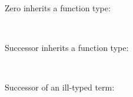 Zero inherits a function type:

\begin{fence}
\begin{code}%
\>[0]\AgdaFunction{\AgdaUnderscore{}}\AgdaSpace{}%
\AgdaSymbol{:}\AgdaSpace{}%
\AgdaSpace{}%
\AgdaSpace{}%
\AgdaSymbol{(}\AgdaSpace{}%
\AgdaSpace{}%
\AgdaSpace{}%
\AgdaSpace{}%
\AgdaSymbol{)}\AgdaSpace{}%
\AgdaSpace{}%
\AgdaSpace{}%
\AgdaSymbol{\AgdaUnderscore{}}\<%
\\
\>[0]\AgdaSymbol{\AgdaUnderscore{}}\AgdaSpace{}%
\AgdaSymbol{=}\AgdaSpace{}%
\<%
\end{code}
\end{fence}

Successor inherits a function type:

\begin{fence}
\begin{code}%
\>[0]\AgdaFunction{\AgdaUnderscore{}}\AgdaSpace{}%
\AgdaSymbol{:}\AgdaSpace{}%
\AgdaSpace{}%
\AgdaSpace{}%
\AgdaSymbol{(}\AgdaSpace{}%
\AgdaSpace{}%
\AgdaSpace{}%
\AgdaSpace{}%
\AgdaSymbol{)}\AgdaSpace{}%
\AgdaSpace{}%
\AgdaSpace{}%
\AgdaSymbol{\AgdaUnderscore{}}\<%
\\
\>[0]\AgdaSymbol{\AgdaUnderscore{}}\AgdaSpace{}%
\AgdaSymbol{=}\AgdaSpace{}%
\<%
\end{code}
\end{fence}

Successor of an ill-typed term:

\begin{fence}
\begin{code}%
\>[0]\AgdaFunction{\AgdaUnderscore{}}\AgdaSpace{}%
\AgdaSymbol{:}\AgdaSpace{}%
\AgdaSpace{}%
\AgdaSpace{}%
\AgdaSymbol{(}\AgdaSpace{}%
\AgdaSpace{}%
\AgdaSpace{}%
\AgdaSymbol{)}\AgdaSpace{}%
\AgdaSpace{}%
\AgdaSpace{}%
\AgdaSymbol{\AgdaUnderscore{}}\<%
\\
\>[0]\AgdaSymbol{\AgdaUnderscore{}}\AgdaSpace{}%
\AgdaSymbol{=}\AgdaSpace{}%
\<%
\end{code}
\end{fence}

